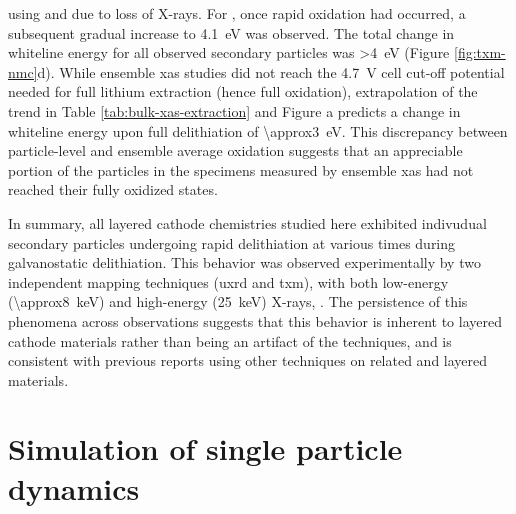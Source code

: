 \documentclass{article}
\begin{document}
using \nmc[333]{} and \nca{} due to loss of X-rays. For \nmc[333]{},
once rapid oxidation had occurred, a subsequent gradual increase to
\SI{4.1}{eV} was observed. The total change in whiteline energy for
all observed secondary particles was \SI{>4}{eV} (Figure
\ref{fig:txm-nmc}d). While ensemble \gls{xas}
studies\cite{deb2005,muto2009} did not reach the \SI{4.7}{V} cell
cut-off potential needed for full lithium extraction (hence full
 oxidation), extrapolation of the trend in Table
\ref{tab:bulk-xas-extraction} and Figure
a predicts a change in whiteline
energy upon full delithiation of \SI{\approx3}{eV}. This discrepancy
between particle-level and ensemble average  oxidation suggests
that an appreciable portion of the particles in the specimens measured
by ensemble \gls{xas} had not reached their fully oxidized states.

In summary, all layered cathode chemistries studied here exhibited
indivudual secondary particles undergoing rapid delithiation at
various times during galvanostatic delithiation. This behavior was
observed experimentally by two independent mapping techniques
(\gls{uxrd} and \gls{txm}), with both low-energy
(\SI{\approx8}{\kilo\electronvolt}) and high-energy
(\SI{25}{\kilo\electronvolt}) X-rays, . The persistence of this
phenomena across observations suggests that this behavior is inherent
to layered cathode materials rather than being an artifact of the
techniques, and is consistent with previous reports using other
techniques on related \nmc{} and  layered
materials\cite{chueh2021,rao2021,wang2020-6}.


\section{Simulation of single particle dynamics}

\end{document}
